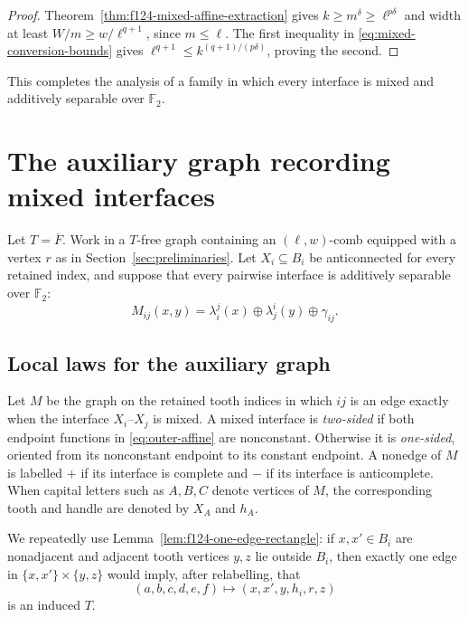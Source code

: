 \documentclass[11pt]{article}
\numberwithin{equation}{section}
\theoremstyle{plain}
\theoremstyle{definition}
\begin{document}
\begin{proof}
Theorem~\ref{thm:f124-mixed-affine-extraction} gives
$k\geq m^\delta\geq\ell^{p\delta}$ and width at least
$W/m\geq w/\ell^{q+1}$, since $m\leq\ell$.  The first inequality in
\eqref{eq:mixed-conversion-bounds} gives
$\ell^{q+1}\leq k^{(q+1)/(p\delta)}$, proving the second.
\end{proof}

This completes the analysis of a family in which every interface is
mixed and additively separable over $\mathbb F_2$.

\section{The auxiliary graph recording mixed interfaces}
\label{sec:outer-graph}

Let $T=\overline F$.  Work in a $T$-free graph containing an
$(\ell,w)$-comb equipped with a vertex $r$ as in
Section~\ref{sec:preliminaries}.  Let $X_i\subseteq B_i$ be
anticonnected for every retained index, and suppose that every pairwise
interface is additively separable over $\mathbb F_2$:
\begin{equation}
 M_{ij}(x,y)=\lambda_i^j(x)\oplus\lambda_j^i(y)\oplus\gamma_{ij}.
 \label{eq:outer-affine}
\end{equation}

\subsection{Local laws for the auxiliary graph}

Let $M$ be the graph on the retained tooth indices in which $ij$ is an
edge exactly when the interface $X_i$--$X_j$ is mixed.  A mixed
interface is \emph{two-sided} if both endpoint functions in
\eqref{eq:outer-affine} are nonconstant.  Otherwise it is
\emph{one-sided}, oriented from its
nonconstant endpoint to its constant endpoint.  A nonedge of $M$ is
labelled $+$ if its interface is complete and $-$ if its interface is
anticomplete.
When capital letters such as $A,B,C$ denote vertices of $M$, the
corresponding tooth and handle are denoted by $X_A$ and $h_A$.

We repeatedly use Lemma~\ref{lem:f124-one-edge-rectangle}: if
$x,x'\in B_i$ are nonadjacent and adjacent tooth vertices $y,z$ lie outside
$B_i$, then exactly one edge in
$\{x,x'\}\times\{y,z\}$ would imply, after relabelling, that
\begin{equation}
       (a,b,c,d,e,f)\longmapsto(x,x',y,h_i,r,z)
 \label{eq:outer-one-edge-witness}
\end{equation}
is an induced $T$.
\end{document}
